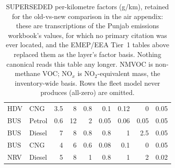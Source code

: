 \begin{table}[!htbp]
\begin{tabular}{@{}llrrrrrrr@{}}
HDV & CNG & 3.5 & 8 & 0.8 & 0.1 & 0.12 & 0 & 0.05 \\
BUS & Petrol & 0.6 & 12 & 2 & 0.05 & 0.06 & 0.05 & 0.05 \\
BUS & Diesel & 7 & 8 & 0.8 & 0.8 & 1 & 2.5 & 0.05 \\
BUS & CNG & 4 & 6 & 0.6 & 0.08 & 0.1 & 0 & 0.05 \\
NRV & Diesel & 5 & 8 & 1 & 0.8 & 1 & 2 & 0.02 \\
\bottomrule
\end{tabular}
\caption{SUPERSEDED per-kilometre factors (g/km), retained for the
old-vs-new comparison in the air appendix: these are transcriptions of the
Punjab emissions workbook's values, for which no primary citation was ever
located, and the EMEP/EEA Tier~1 tables above replaced them as the layer's
factor basis. Nothing canonical reads this table any longer.
NMVOC is non-methane VOC; NO$_x$ is NO$_2$-equivalent mass, the
inventory-wide basis.
Rows the fleet model never produces (all-zero) are omitted.}
\label{tab:s2gkm}
\end{table}
